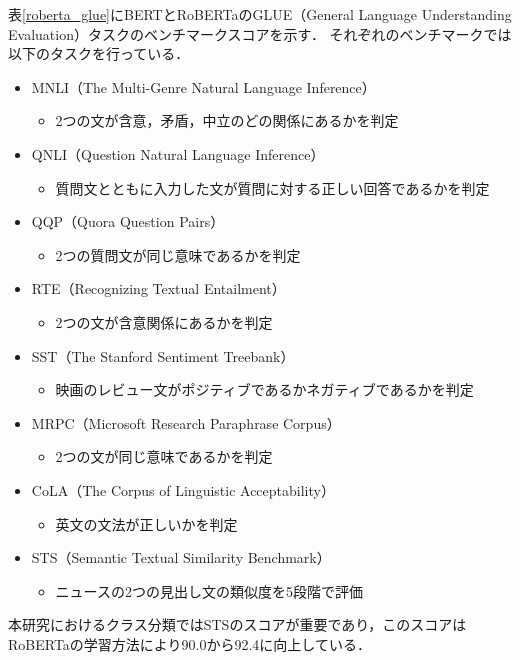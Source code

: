\documentclass[12pt,a4j]{jreport}
\begin{document}
表\ref{roberta_glue}にBERTとRoBERTaのGLUE（General Language Understanding Evaluation）タスクのベンチマークスコアを示す．
それぞれのベンチマークでは以下のタスクを行っている．

\begin{itemize}
  \item MNLI（The Multi-Genre Natural Language Inference）
  \begin{itemize}
    \item 2つの文が含意，矛盾，中立のどの関係にあるかを判定
  \end{itemize}
  \item QNLI（Question Natural Language Inference）
  \begin{itemize}
    \item 質問文とともに入力した文が質問に対する正しい回答であるかを判定
  \end{itemize}
  \item QQP（Quora Question Pairs）
  \begin{itemize}
    \item 2つの質問文が同じ意味であるかを判定
  \end{itemize}
  \item RTE（Recognizing Textual Entailment）
  \begin{itemize}
    \item 2つの文が含意関係にあるかを判定
  \end{itemize}
  \item SST（The Stanford Sentiment Treebank）
  \begin{itemize}
    \item 映画のレビュー文がポジティブであるかネガティブであるかを判定
  \end{itemize}
  \item MRPC（Microsoft Research Paraphrase Corpus）
  \begin{itemize}
    \item 2つの文が同じ意味であるかを判定
  \end{itemize}
  \item CoLA（The Corpus of Linguistic Acceptability）
  \begin{itemize}
    \item 英文の文法が正しいかを判定
  \end{itemize}
  \item STS（Semantic Textual Similarity Benchmark）
  \begin{itemize}
    \item ニュースの2つの見出し文の類似度を5段階で評価
  \end{itemize}
\end{itemize}
本研究におけるクラス分類ではSTSのスコアが重要であり，このスコアはRoBERTaの学習方法により90.0から92.4に向上している．
\end{document}

